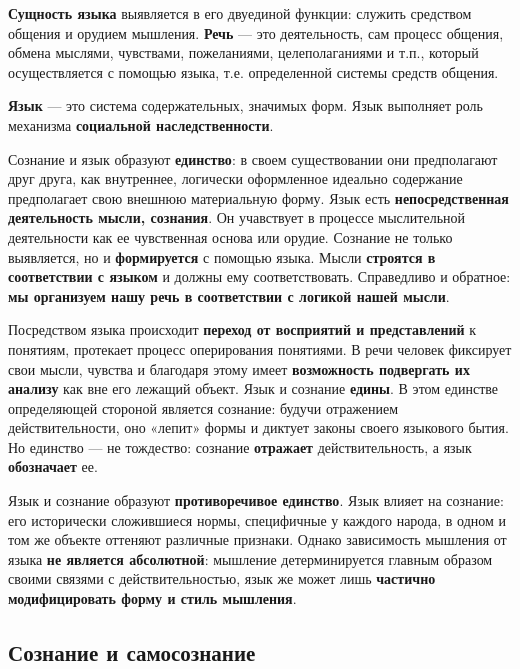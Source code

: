 \documentclass{article}
\begin{document}
\begin{flushleft}

\textbf{Сущность языка} выявляется в его двуединой функции: служить средством общения и орудием мышления. \textbf{Речь} — это деятельность, сам процесс общения, обмена мыслями, чувствами, пожеланиями, целеполаганиями и т.п., который осуществляется с помощью языка, т.е. определенной системы средств общения.

\textbf{Язык} — это система содержательных, значимых форм. Язык выполняет роль механизма \textbf{социальной наследственности}.

Сознание и язык образуют \textbf{единство}: в своем существовании они предполагают друг друга, как внутреннее, логически оформленное идеально содержание предполагает свою внешнюю материальную форму. Язык есть \textbf{непосредственная деятельность мысли, сознания}. Он учавствует в процессе мыслительной деятельности как ее чувственная основа или орудие. Сознание не только выявляется, но и \textbf{формируется} с помощью языка. Мысли \textbf{строятся в соответствии с языком} и должны ему соответствовать. Справедливо и обратное: \textbf{мы организуем нашу речь в соответствии с логикой нашей мысли}.

Посредством языка происходит \textbf{переход от восприятий и представлений} к понятиям, протекает процесс оперирования понятиями. В речи человек фиксирует свои мысли, чувства и благодаря этому имеет \textbf{возможность подвергать их анализу} как вне его лежащий объект. Язык и сознание \textbf{едины}. В этом единстве определяющей стороной является сознание: будучи отражением действительности, оно «лепит» формы и диктует законы своего языкового бытия. Но единство — не тождество: сознание \textbf{отражает} действительность, а язык \textbf{обозначает} ее.

Язык и сознание образуют \textbf{противоречивое единство}. Язык влияет на сознание: его исторически сложившиеся нормы, специфичные у каждого народа, в одном и том же объекте оттеняют различные признаки. Однако зависимость мышления от языка \textbf{не является абсолютной}: мышление детерминируется главным образом своими связями с действительностью, язык же может лишь \textbf{частично модифицировать форму и стиль мышления}.

\end{flushleft}

\pagebreak
\subsection{Сознание и самосознание}
\end{document}

